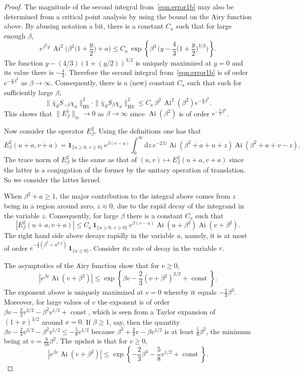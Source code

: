 \documentclass[AHL,Unicode,longabstracts]{cedram}
\newcommand*{\dd}{\mathrm{d}}
\newcommand*{\dz}{\dd z}
\DeclareMathOperator{\tr}{tr}
\DeclareMathOperator{\hs}{HS}
\DeclareMathOperator{\Ai}{Ai}
\DeclareMathOperator{\const}{const}
\newcommand{\ind}[1]{\mathbf{1}_{\{ #1 \}}}
\begin{document}
\begin{proof}
The magnitude of the second integral from~\eqref{eqn:error1b} may also be determined from a critical point analysis by using the bound on the Airy function above. By abusing notation a bit, there is a constant $C_a$ such that for large enough $\beta$,
\[
e^{\beta^3 y} \, \Ai^2 \Big(\beta^2\Big(1 + \frac{y}{2}\Big) + a \Big) \leq C_a\,
\exp \left \{ \beta^3 \, \Big (y - \frac{4}{3} \Big(1+ \frac{y}{2}\Big)^{3/2} \Big) \right \}.
\]
The function $y - (4/3)(1+ (y/2))^{3/2}$ is uniquely maximized at $y = 0$ and its value there is $-\frac{4}{3}$. Therefore the second integral from~\eqref{eqn:error1b} is of order $e^{-\frac{4}{3}\beta^3}$ as $\beta \to \infty$. Consequently, there is a (new) constant $C_a$ such that such for sufficiently large $\beta$,
\[
\| \bar{\chi}_0 S_{-\beta} \chi_a\|^2_{\hs} \cdot \| \bar{\chi}_0 S_{\beta} \chi_a \|^2_{\hs} \leq
C_a \, \beta^2 \, \Ai^2(\beta^2) e^{-\frac{4}{3}\beta^3}.
\]
This shows that $\|E^1_{\beta}\|_{\tr} \to 0$ as $\beta \to \infty$ since $\Ai(\beta^2)$ is of order $e^{-\frac{2}{3}\beta^3}$.

Now consider the operator $E^2_{\beta}$. Using the definitions one has that
\[
E^2_{\beta}(u+a,v+a) = \ind{u\geq 0, \, v\geq 0} \, e^{\beta(v-u)}
\int_0^{\infty} \dz\, e^{-2\beta z} \Ai(\beta^2 +a +u +z) \Ai(\beta^2+a +v-z).
\]
The trace norm of $E^2_{\beta}$ is the same as that of $(u,v) \mapsto E^2_{\beta}(u+a,v+a)$ since the latter is a conjugation of the former by the unitary operation of translation. So we consider the latter kernel.

When $\beta^2 + a \geq 1$, the major contribution to the integral above comes from $z$ being in a region around zero, $z \approx 0$, due to the rapid decay of the integrand in the variable $z$. Consequently, for large $\beta$ there is a constant $C_a$ such that
\begin{equation}\label{eqn:error1c}
|E^2_{\beta}(u+a, v+a)| \leq C_a\, \ind{u \geq 0, \, v \geq 0} \, e^{\beta(v-u)} \Ai(u+\beta^2) \Ai(v+\beta^2).
\end{equation}
The right hand side above decays rapidly in the variable $u$, namely, it is at most of order $e^{-\frac{2}{3} (\beta^3 + u^{3/2})}\, \ind{u \geq 0}$. Consider its rate of decay in the variable $v$.

The asymptotics of the Airy function show that for $v \geq 0$,
\[
|e^{\beta v} \Ai(v+\beta^2)| \leq \exp \left \{ \beta v - \frac{2}{3}(v+\beta^2)^{3/2} + \const \right \}.
\]
The exponent above is uniquely maximized at $v = 0$ whereby it equals $-\frac{2}{3}\beta^3$. Moreover, for large values of $v$ the exponent is of order $\beta v -\frac{2}{3} v^{3/2} -\beta^2 v^{1/2} + \const$, which is seen from a Taylor expansion of $(1+x)^{3/2}$ around $x =0$. If $\beta \geq 1$, say, then the quantity $\beta v -\frac{2}{3} v^{3/2} -\beta^2 v^{1/2} \leq - \frac{5}{8} v^{1/2}$ because $\beta^2 + \frac{2}{3} v - \beta v^{1/2}$ is at least $\frac{5}{8}\beta^2$, the minimum being at $v = \frac{9}{16}\beta^2$. The upshot is that for $v \geq 0$,
\[
|e^{\beta v} \Ai(v+\beta^2)| \leq \exp \left \{ - \frac{2}{3}\beta^3 -\frac{5}{8}v^{1/2} + \const \right \}.
\]


\end{proof}
\end{document}
